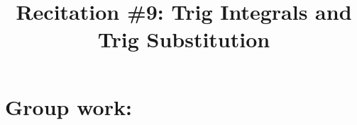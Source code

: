 \documentclass[handout]{ximera}
\title{Recitation \#9: Trig Integrals and Trig Substitution}
\begin{document}
\begin{abstract}		\end{abstract}
\maketitle

\section{Group work:}
\end{document}
